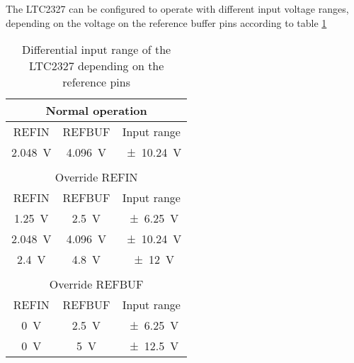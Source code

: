 The LTC2327 can be configured to operate with different input voltage ranges, depending on the voltage on the reference buffer pins according to table \ref{tab:ltc2327:input}
\begin{table}
	\centering
	\begin{tabular}{ccc}\hline
		\multicolumn{3}{c}{Normal operation}\\\hline
		REFIN & REFBUF & Input range \\
		\SI{2.048}{\volt} & \SI{4.096}{\volt} & \SI{\pm10.24}{\volt}\\
		&&\\
		\multicolumn{3}{c}{Override REFIN}\\\hline
		REFIN & REFBUF & Input range \\
		\SI{1.25}{\volt} & \SI{2.5}{\volt} & \SI{\pm6.25}{\volt}\\
		\SI{2.048}{\volt} & \SI{4.096}{\volt} & \SI{\pm10.24}{\volt}\\
		\SI{2.4}{\volt} & \SI{4.8}{\volt} & \SI{\pm12}{\volt}\\
		&&\\
		\multicolumn{3}{c}{Override REFBUF}\\\hline
		REFIN & REFBUF & Input range \\
		\SI{0}{\volt} & \SI{2.5}{\volt} & \SI{\pm6.25}{\volt}\\
		\SI{0}{\volt} & \SI{5}{\volt} & \SI{\pm12.5}{\volt}\\\hline
	\end{tabular}
	\caption{Differential input range of the LTC2327 depending on the reference pins}
	\label{tab:ltc2327:input}
\end{table}